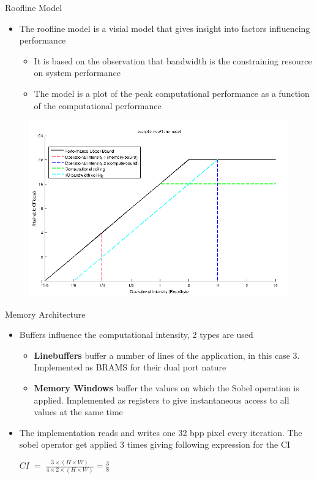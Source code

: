 \documentclass{beamer}
\begin{document}
\begin{frame}{Roofline Model}
  
  \begin{itemize}
  \item The roofline model is a visial model that gives insight into
    factors influencing performance
    \begin{itemize}
    \item It is based on the observation that bandwidth is the
      constraining resource on system performance
    \item The model is a plot of the peak computational performance as
      a function of the computational performance
    \end{itemize}
  \end{itemize}
  \begin{figure}[H]
    \centering
    \includegraphics[scale=0.3]{../images/matlab_plots/roofline_example.png}

  \end{figure}
\end{frame}


\begin{frame}{Memory Architecture}
  \begin{itemize}
  \item Buffers influence the computational intensity, 2 types are
    used
    \begin{itemize}
    \item \textbf{Linebuffers} buffer a number of lines of the
      application, in this case 3. Implemented as BRAMS for their dual
      port nature
    \item \textbf{Memory Windows} buffer the values on which the Sobel
      operation is applied. Implemented as registers to give
      instantaneous access to all values at the same time
    \end{itemize}
  \item The implementation reads and writes one 32 bpp pixel every
    iteration. The sobel operator get applied 3 times giving following
    expression for the CI \medskip
    \begin{center}
      $CI\;=\;\frac{3 \times (H \times W)}{4 \times 2 \times (H \times
        W)} = \frac{3}{8}$
    \end{center}
  \end{itemize}
\end{frame}
\end{document}
